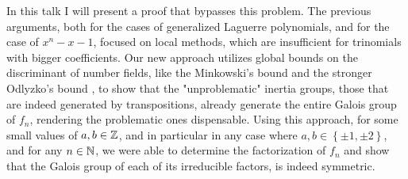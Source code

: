 \documentclass[../../main.tex]{subfiles}
\begin{document}
In this talk I will present a proof that bypasses this problem.
The previous arguments, both for the cases of generalized Laguerre polynomials, and for the case of $x^n - x - 1$, focused on local methods, which are insufficient for trinomials with bigger coefficients. 
Our new approach utilizes global bounds on the discriminant of number fields, like the Minkowski's bound and the stronger Odlyzko's bound \cite{OdlyzkoBoundsII}, to show that the "unproblematic" inertia groups, those that are indeed generated by transpositions, already generate the entire Galois group of $f_n$, rendering the problematic ones dispensable.
Using this approach, for some small values of $a,b \in \mathbb{Z}$, and in particular in any case where $a,b \in \left\{ \pm 1, \pm 2 \right\}$, and for any $n \in \mathbb{N}$, we were able to determine the factorization of $f_n$ and show that the Galois group of each of its irreducible factors, is indeed symmetric.
\end{document}
